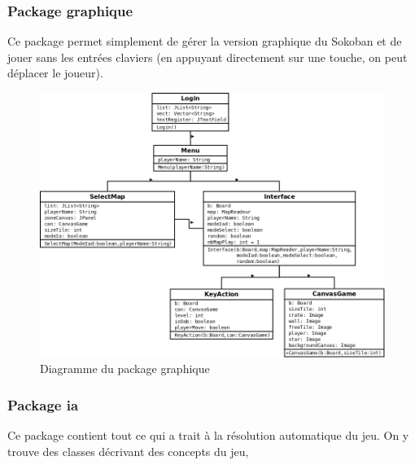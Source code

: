 \documentclass[a4paper,12pt]{article} %
\begin{document}
\subsubsection{Package graphique}

Ce package permet simplement de gérer la version graphique du Sokoban et de jouer sans les entrées claviers (en appuyant directement sur une touche, on peut déplacer le joueur).

\begin{figure}[!h]
\centering
\includegraphics[scale=0.4]{images/graphique.png}
\caption{Diagramme du package graphique}
\end{figure}

\subsubsection{Package ia}

Ce package contient tout ce qui a trait à la résolution automatique du jeu. On y trouve des classes décrivant des concepts du jeu, 
\end{document}
